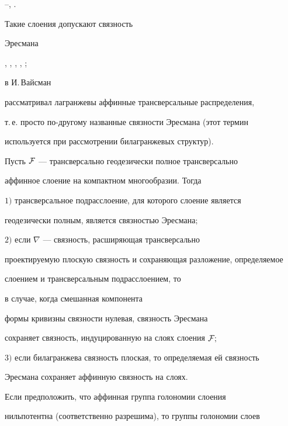\cite{WO6}--\cite{WO9}, \cite{WO3}.


Такие слоения допускают связность


Эресмана


\cite{VA0}, \cite{WO5}, \cite{WO3}, \cite{WO1}, \cite{WO7};


в \cite{VA0} И.\,Вайсман


рассматривал лагранжевы аффинные трансверсальные распределения,


т.\,е. просто по-другому названные связности Эресмана (этот термин


используется при рассмотрении билагранжевых структур).





\begin{thm}


Пусть $\cal F$ --- трансверсально геодезически полное трансверсально


аффинное слоение на компактном многообразии. Тогда





$1)$ трансверсальное подрасслоение, для которого слоение является


геодезически полным, является связностью Эресмана$;$





$2)$ если $\nabla$ --- связность, расширяющая трансверсально


проектируемую плоскую связность и сохраняющая разложение, определяемое


слоением и трансверсальным подрасслоением, то 


в случае, когда смешанная компонента


формы кривизны связности нулевая, связность Эресмана


сохраняет связность, индуцированную на слоях слоения $\cal F;$





$3)$ если билагранжева связность плоская, то определяемая ей связность


Эресмана сохраняет аффинную связность на слоях.


\end{thm}





Если предположить, что аффинная группа голономии слоения


нильпотентна (соответственно разрешима), то группы голономии слоев


